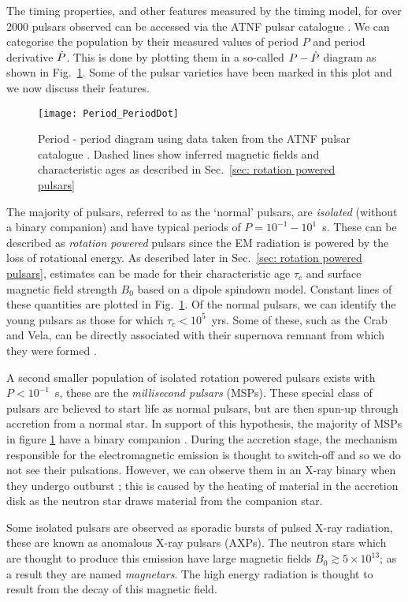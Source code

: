 The timing properties, and other features measured by the timing model, for
over 2000 pulsars observed can be accessed via the ATNF pulsar catalogue
\citep{ATNF}.  We can categorise the population by their measured values of
period $P$ and period derivative $\dot{P}$. This is done by plotting them in a
so-called $P - \dot{P}$ diagram as shown in Fig.~\ref{fig: Period_PeriodDot}.
Some of the pulsar varieties have been marked in this plot and we now discuss
their features.

\begin{figure}[hb]
    \centering
    \texttt{[image: Period\_PeriodDot]}
    \caption{Period - period diagram using data taken from the ATNF pulsar
             catalogue \citep{ATNF}. Dashed lines show inferred magnetic fields
             and characteristic ages as described in Sec.~\ref{sec: rotation
             powered pulsars}}
    \label{fig: Period_PeriodDot}
\end{figure}

The majority of pulsars, referred to as the `normal' pulsars, are
\emph{isolated} (without a binary companion) and have typical periods of
$P=10^{-1}-10^{1}$~s. These can be described as \emph{rotation powered} pulsars
since the EM radiation is powered by the loss of rotational energy. As
described later in Sec.~\ref{sec: rotation powered pulsars}, estimates can be made
for their characteristic age $\tau_{c}$ and surface magnetic field strength
$B_{0}$ based on a dipole spindown model. Constant lines of these quantities
are plotted in Fig.~\ref{fig: Period_PeriodDot}. Of the normal pulsars, we
can identify the young pulsars as those for which $\tau_{c}<10^{5}$~yrs. Some
of these, such as the Crab and Vela, can be directly associated with their
supernova remnant from which they were formed \citep{Kaspi1996}.

A second smaller population of isolated rotation powered pulsars exists with
$P<10^{-1}$~s, these are the \emph{millisecond pulsars} (MSPs). These special
class of pulsars are believed to start life as normal pulsars, but are then
spun-up through accretion from a normal star. In support of this hypothesis,
the majority of MSPs in figure \ref{fig: Period_PeriodDot} have a binary
companion \citep{wijnands1998millisecond}.  During the accretion stage, the
mechanism responsible for the electromagnetic emission is thought to switch-off
and so we do not see their pulsations. However, we can observe them in an X-ray
binary when they undergo outburst \citep{lewin1997x}; this is caused by the
heating of material in the accretion disk as the neutron star draws material
from the companion star.

Some isolated pulsars are observed as sporadic bursts of pulsed X-ray radiation,
these are known as anomalous X-ray pulsars (AXPs). The neutron stars which are
thought to produce this emission have large magnetic fields $B_{0}\gtrsim
5\times10^{13}$; as a result they are named \emph{magnetars}. The high energy
radiation is thought to result from the decay of this magnetic field.
